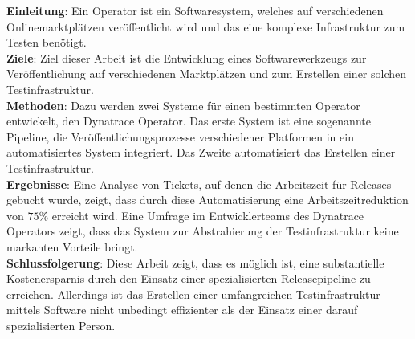 \textbf{Einleitung}:
Ein Operator ist ein Softwaresystem, welches auf verschiedenen Onlinemarktplätzen veröffentlicht wird und das eine komplexe Infrastruktur zum Testen benötigt. \\
\textbf{Ziele}:
Ziel dieser Arbeit ist die Entwicklung eines Softwarewerkzeugs zur Veröffentlichung auf verschiedenen Marktplätzen und zum Erstellen einer solchen Testinfrastruktur.\\
\textbf{Methoden}:
Dazu werden zwei Systeme für einen bestimmten Operator entwickelt, den Dynatrace Operator.
Das erste System ist eine sogenannte Pipeline, die Veröffentlichungsprozesse verschiedener Platformen in ein automatisiertes System integriert.
Das Zweite automatisiert das Erstellen einer Testinfrastruktur. \\
\textbf{Ergebnisse}:
Eine Analyse von Tickets, auf denen die Arbeitszeit für Releases gebucht wurde, zeigt, dass durch diese Automatisierung eine Arbeitszeitreduktion von $75 \%$ erreicht wird.
Eine Umfrage im Entwicklerteams des Dynatrace Operators zeigt, dass das System zur Abstrahierung der Testinfrastruktur keine markanten Vorteile bringt. \\
\textbf{Schlussfolgerung}:
Diese Arbeit zeigt, dass es möglich ist, eine substantielle Kostenersparnis durch den Einsatz einer spezialisierten Releasepipeline zu erreichen.
Allerdings ist das Erstellen einer umfangreichen Testinfrastruktur mittels Software nicht unbedingt effizienter als der Einsatz einer darauf spezialisierten Person.
